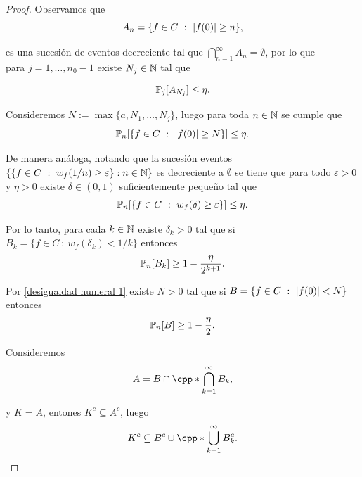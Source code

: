 \documentclass[12pt, letterpaper]{article}
\numberwithin{equation}{section}
\begin{document}
\begin{proof}
    Observamos que 
    \begin{equation*}
    A_n=\{f\in C\ :\ \lvert f(0)\rvert\geq n\},
    \end{equation*}
    
    es una sucesión de eventos decreciente tal que $\bigcap_{n=1}^{\infty}A_n=\emptyset$, por lo que\\ para $j=1,\dots,n_0-1$ existe $N_j\in\N$ tal que 
    
    \begin{equation*}
    \PP_j[A_{N_j}]\leq \eta.
    \end{equation*}
    
    Consideremos $N:=\max\{a,N_1,\dots,N_j\}$, luego para toda $n\in\N$ se cumple que 
    \begin{equation}
    \label{desigualdad numeral 1}
    \PP_n[\{f\in C\ :\ \abs{f(0)}\geq N\}]\leq \eta.
    \end{equation}
    
    De manera análoga, notando que la sucesión eventos $\{\{f\in C\ :\ w_f(1/n)\geq \varepsilon\}: n\in\N\}$ es decreciente a $\emptyset$ se tiene que para todo $\varepsilon>0$ y $\eta>0$ existe $\delta\in (0,1)$ suficientemente pequeño tal que
    \begin{equation*}
    \PP_n[\{f\in C\ :\ w_f(\delta)\geq \varepsilon\}]\leq \eta.
    \end{equation*}
    
    Por lo tanto, para cada $k\in\N$ existe $\delta_k>0$ tal que si  $B_k=\{f\in C\ :\ w_f(\delta_k)<1/k\}$ entonces
    \begin{equation}
    \label{desigualdad numeral 2 Bk}
    \PP_n[B_k]\geq 1-\frac{\eta}{2^{k+1}}.
    \end{equation}
    
    Por  \eqref{desigualdad numeral 1} existe $N>0$ tal que si $B=\{f\in C\ :\ \lvert f(0)\rvert< N\}$ entonces
    \begin{equation}
    \label{desigualdad numeral 1 B}
    \PP_n[B]\geq 1-\frac{\eta}{2}.
    \end{equation}
    
    Consideremos
    \begin{equation*}
    A=B\cap \cpp*{\bigcap_{k=1}^{\infty}B_k},
    \end{equation*}
    
    y $K=\overline{A}$, entones $K^c\subseteq A^c$, luego 
    \begin{equation*}
    K^c\subseteq B^c\cup \cpp*{\bigcup_{k=1}^{\infty}B_k^c}.
    \end{equation*}
    

\end{proof}
\end{document}

